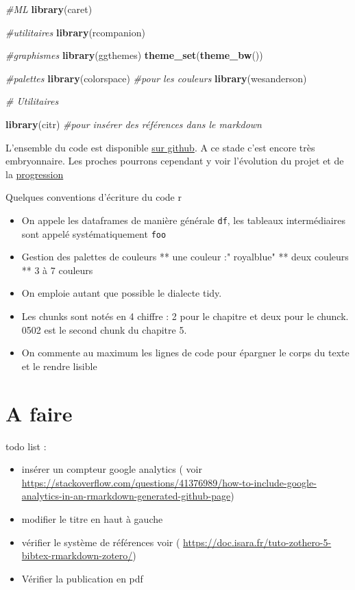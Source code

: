 \documentclass[
]{book}
\newenvironment{Shaded}{\begin{snugshade}}{\end{snugshade}}
\newcommand{\CommentTok}[1]{\textcolor[rgb]{0.56,0.35,0.01}{\textit{#1}}}
\newcommand{\KeywordTok}[1]{\textcolor[rgb]{0.13,0.29,0.53}{\textbf{#1}}}
\newcommand{\NormalTok}[1]{#1}
\providecommand{\tightlist}{%
  \setlength{\itemsep}{0pt}\setlength{\parskip}{0pt}}
\begin{document}
\begin{Shaded}
\begin{Highlighting}[]
\CommentTok{#ML}
\KeywordTok{library}\NormalTok{(caret)}

\CommentTok{#utilitaires}
\KeywordTok{library}\NormalTok{(rcompanion)}

\CommentTok{#graphismes}
\KeywordTok{library}\NormalTok{(ggthemes)}
\KeywordTok{theme_set}\NormalTok{(}\KeywordTok{theme_bw}\NormalTok{())}


\CommentTok{#palettes}
\KeywordTok{library}\NormalTok{(colorspace) }\CommentTok{#pour les couleurs}
\KeywordTok{library}\NormalTok{(wesanderson)}



\CommentTok{# Utilitaires}

\KeywordTok{library}\NormalTok{(citr) }\CommentTok{#pour insérer des références dans le markdown}
\end{Highlighting}
\end{Shaded}

L'ensemble du code est disponible \href{https://github.com/BenaventC/Datasciences}{sur github}. A ce stade c'est encore très embryonnaire. Les proches pourrons cependant y voir l'évolution du projet et de la \href{https://benaventc.github.io/Datascience/}{progression}

Quelques conventions d'écriture du code r

\begin{itemize}
\tightlist
\item
  On appele les dataframes de manière générale \texttt{df}, les tableaux intermédiaires sont appelé systématiquement \texttt{foo}
\item
  Gestion des palettes de couleurs
  ** une couleur :" royalblue"
  ** deux couleurs
  ** 3 à 7 couleurs
\item
  On emploie autant que possible le dialecte tidy.
\item
  Les chunks sont notés en 4 chiffre : 2 pour le chapitre et deux pour le chunck. 0502 est le second chunk du chapitre 5.
\item
  On commente au maximum les lignes de code pour épargner le corps du texte et le rendre lisible
\end{itemize}

\hypertarget{a-faire}{%
\section{A faire}\label{a-faire}}

todo list :

\begin{itemize}
\tightlist
\item
  insérer un compteur google analytics ( voir \url{https://stackoverflow.com/questions/41376989/how-to-include-google-analytics-in-an-rmarkdown-generated-github-page})
\item
  modifier le titre en haut à gauche
\item
  vérifier le système de références voir ( \url{https://doc.isara.fr/tuto-zothero-5-bibtex-rmarkdown-zotero/})
\item
  Vérifier la publication en pdf
\end{itemize}
\end{document}
